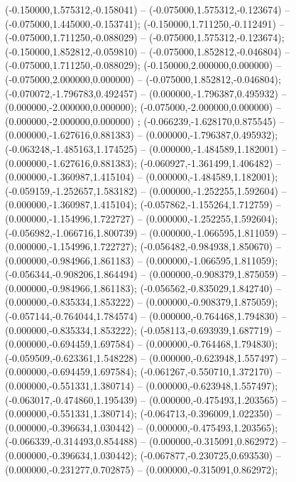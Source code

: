  (-0.150000,1.575312,-0.158041) -- (-0.075000,1.575312,-0.123674) -- (-0.075000,1.445000,-0.153741);
 (-0.150000,1.711250,-0.112491) -- (-0.075000,1.711250,-0.088029) -- (-0.075000,1.575312,-0.123674);
 (-0.150000,1.852812,-0.059810) -- (-0.075000,1.852812,-0.046804) -- (-0.075000,1.711250,-0.088029);
 (-0.150000,2.000000,0.000000) -- (-0.075000,2.000000,0.000000) -- (-0.075000,1.852812,-0.046804);
 (-0.070072,-1.796783,0.492457) -- (0.000000,-1.796387,0.495932) -- (0.000000,-2.000000,0.000000);
 (-0.075000,-2.000000,0.000000) -- (0.000000,-2.000000,0.000000) ;
 (-0.066239,-1.628170,0.875545) -- (0.000000,-1.627616,0.881383) -- (0.000000,-1.796387,0.495932);
 (-0.063248,-1.485163,1.174525) -- (0.000000,-1.484589,1.182001) -- (0.000000,-1.627616,0.881383);
 (-0.060927,-1.361499,1.406482) -- (0.000000,-1.360987,1.415104) -- (0.000000,-1.484589,1.182001);
 (-0.059159,-1.252657,1.583182) -- (0.000000,-1.252255,1.592604) -- (0.000000,-1.360987,1.415104);
 (-0.057862,-1.155264,1.712759) -- (0.000000,-1.154996,1.722727) -- (0.000000,-1.252255,1.592604);
 (-0.056982,-1.066716,1.800739) -- (0.000000,-1.066595,1.811059) -- (0.000000,-1.154996,1.722727);
 (-0.056482,-0.984938,1.850670) -- (0.000000,-0.984966,1.861183) -- (0.000000,-1.066595,1.811059);
 (-0.056344,-0.908206,1.864494) -- (0.000000,-0.908379,1.875059) -- (0.000000,-0.984966,1.861183);
 (-0.056562,-0.835029,1.842740) -- (0.000000,-0.835334,1.853222) -- (0.000000,-0.908379,1.875059);
 (-0.057144,-0.764044,1.784574) -- (0.000000,-0.764468,1.794830) -- (0.000000,-0.835334,1.853222);
 (-0.058113,-0.693939,1.687719) -- (0.000000,-0.694459,1.697584) -- (0.000000,-0.764468,1.794830);
 (-0.059509,-0.623361,1.548228) -- (0.000000,-0.623948,1.557497) -- (0.000000,-0.694459,1.697584);
 (-0.061267,-0.550710,1.372170) -- (0.000000,-0.551331,1.380714) -- (0.000000,-0.623948,1.557497);
 (-0.063017,-0.474860,1.195439) -- (0.000000,-0.475493,1.203565) -- (0.000000,-0.551331,1.380714);
 (-0.064713,-0.396009,1.022350) -- (0.000000,-0.396634,1.030442) -- (0.000000,-0.475493,1.203565);
 (-0.066339,-0.314493,0.854488) -- (0.000000,-0.315091,0.862972) -- (0.000000,-0.396634,1.030442);
 (-0.067877,-0.230725,0.693530) -- (0.000000,-0.231277,0.702875) -- (0.000000,-0.315091,0.862972);
